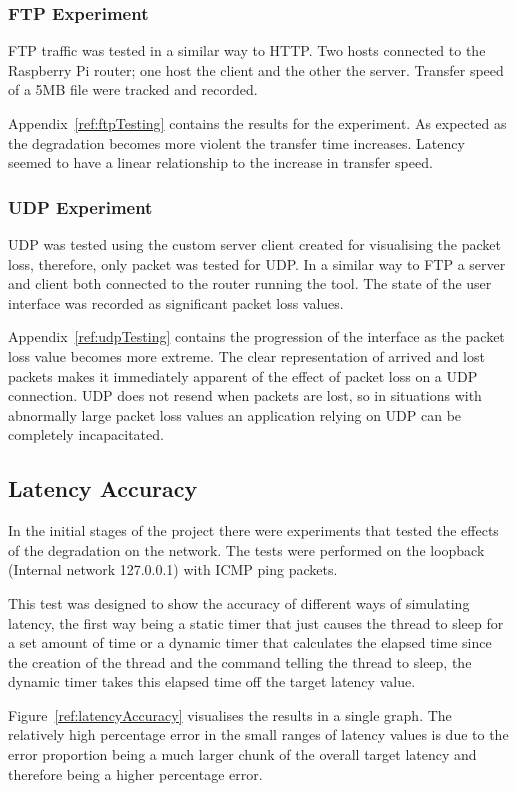 \subsubsection{FTP Experiment}
FTP traffic was tested in a similar way to HTTP. Two hosts connected to the Raspberry Pi router; one host the client and the other the server. Transfer speed of a 5MB file were tracked and recorded.

Appendix~\ref{ref:ftpTesting} contains the results for the experiment. As expected as the degradation becomes more violent the transfer time increases. Latency seemed to have a linear relationship to the increase in transfer speed.

\subsubsection{UDP Experiment}
UDP was tested using the custom server client created for visualising the packet loss, therefore, only packet was tested for UDP. In a similar way to FTP a server and client both connected to the router running the tool. The state of the user interface was recorded as significant packet loss values.

Appendix~\ref{ref:udpTesting} contains the progression of the interface as the packet loss value becomes more extreme. The clear representation of arrived and lost packets makes it immediately apparent of the effect of packet loss on a UDP connection. UDP does not resend when packets are lost, so in situations with abnormally large packet loss values an application relying on UDP can be completely incapacitated.

\subsection{Latency Accuracy}
In the initial stages of the project there were experiments that tested the effects of the degradation on the network. The tests were performed on the loopback (Internal network 127.0.0.1) with ICMP ping packets.

This test was designed to show the accuracy of different ways of simulating latency, the first way being a static timer that just causes the thread to sleep for a set amount of time or a dynamic timer that calculates the elapsed time since the creation of the thread and the command telling the thread to sleep, the dynamic timer takes this elapsed time off the target latency value.

Figure~\ref{ref:latencyAccuracy} visualises the results in a single graph. The relatively high percentage error in the small ranges of latency values is due to the error proportion being a much larger chunk of the overall target latency and therefore being a higher percentage error.

